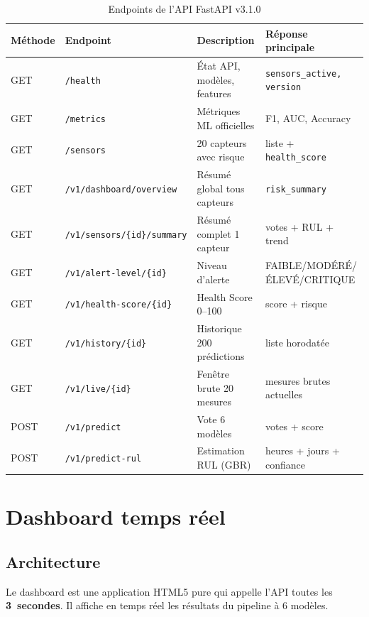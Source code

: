 \documentclass[12pt,a4paper]{report}
\begin{document}
\begin{table}[h]
\centering
\caption{Endpoints de l'API FastAPI v3.1.0}
\begin{tabular}{llp{4cm}p{3.5cm}}
\toprule
\textbf{Méthode} & \textbf{Endpoint} & \textbf{Description} & \textbf{Réponse principale} \\
\midrule
GET  & \texttt{/health}                     & État API, modèles, features & \texttt{sensors\_active, version} \\
GET  & \texttt{/metrics}                    & Métriques ML officielles    & F1, AUC, Accuracy \\
GET  & \texttt{/sensors}                    & 20 capteurs avec risque     & liste + \texttt{health\_score} \\
GET  & \texttt{/v1/dashboard/overview}      & Résumé global tous capteurs & \texttt{risk\_summary} \\
GET  & \texttt{/v1/sensors/\{id\}/summary}  & Résumé complet 1 capteur    & votes + RUL + trend \\
GET  & \texttt{/v1/alert-level/\{id\}}      & Niveau d'alerte             & FAIBLE/MODÉRÉ/ÉLEVÉ/CRITIQUE \\
GET  & \texttt{/v1/health-score/\{id\}}     & Health Score 0--100         & score + risque \\
GET  & \texttt{/v1/history/\{id\}}          & Historique 200 prédictions  & liste horodatée \\
GET  & \texttt{/v1/live/\{id\}}             & Fenêtre brute 20 mesures    & mesures brutes actuelles \\
POST & \texttt{/v1/predict}                  & Vote 6 modèles              & votes + score \\
POST & \texttt{/v1/predict-rul}              & Estimation RUL (GBR)        & heures + jours + confiance \\
\bottomrule
\end{tabular}
\end{table}

\section{Dashboard temps réel}

\subsection{Architecture}

Le dashboard est une application HTML5 pure qui appelle l'API toutes les \textbf{3~secondes}.
Il affiche en temps réel les résultats du pipeline à 6 modèles.
\end{document}
